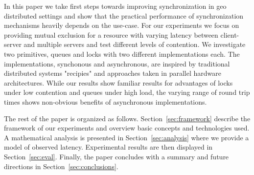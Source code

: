 In this paper we take first steps towards improving synchronization in geo distributed settings and show that the practical performance of synchronization mechanisms heavily depends on the use-case. For our experiments we focus on providing mutual exclusion for a resource with varying latency between client-server and multiple servers and test different levels of contention. We investigate two primitives, queues and locks with two different implementations each. The implementations, synchonous and asynchronous, are inspired by traditional distributed systems "recipies" and approaches taken in parallel hardware architectures. While our results show familiar results for advantages of locks under low contention and queues under high load, the varying range of round trip times shows non-obvious benefits of asynchronous implementations.

The rest of the paper is organized as follows. Section~\ref{sec:framework} describe the framework of our experiments and overview basic concepts and technologies used. A mathematical analysis is presented in Section~\ref{sec:analysis} where we provide a model of observed latency. Experimental results are then displayed in Section~\ref{sec:eval}. Finally, the paper concludes with a summary and future directions in Section~\ref{sec:conclusions}.